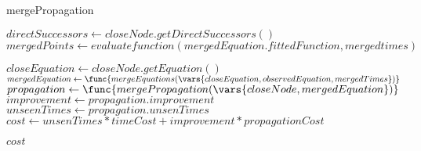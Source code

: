 	\begin{algorithm}
	\caption{mergePropagation}
	\label{mergePropagation}
	\begin{algorithmic}[1]
		
		\State $directSuccessors \gets closeNode.getDirectSuccessors()$
		\State $mergedPoints \gets evaluatefunction(mergedEquation.fittedFunction, mergedtimes) $
		
		
		\State $closeEquation \gets closeNode.getEquation() $
		\State $mergedEquation \gets \func{mergeEquations(\vars{closeEquation, observedEquation, mergedTimes})}$
		\State $propagation \gets \func{mergePropagation(\vars{closeNode, mergedEquation})}$
		\State $improvement \gets propagation.improvement$
		\State $unseenTimes \gets propagation.unsenTimes$
		\State $cost \gets unsenTimes*timeCost + improvement*propagationCost$
		
		\State \Return $cost$
		
		\EndProcedure
	\end{algorithmic}
\end{algorithm}